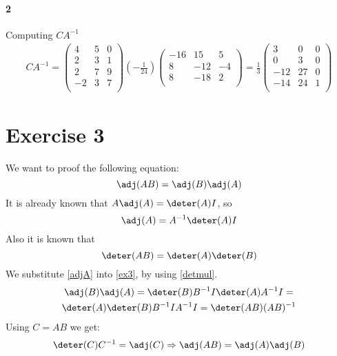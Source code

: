 \paragraph*{2}
Computing $CA^{-1}$
\begin{gather*}
CA^{-1} =
\left( \begin{array}{ccc}
4 & 5 & 0 \\
2 & 3 & 1\\
2 & 7 & 9\\
-2 & 3 & 7\\
\end{array} \right)
( -\frac{1}{24})
\left( \begin{array}{ccc}
-16 & 15 & 5 \\
8 & -12 & -4 \\
8 & -18 & 2 \\
\end{array} \right)
=
\frac{1}{3}
\left( \begin{array}{ccc}
3 & 0 & 0\\
0 & 3 & 0\\
-12 & 27 & 0\\
-14 & 24 & 1\\
\end{array} \right)
\end{gather*}

\section{Exercise 3}
We want to proof the following equation:
\begin{equation}
\label{ex3}
\adj (AB) = \adj (B) \adj (A)
\end{equation}
It is already known that $A \adj (A) = \deter (A) I$, so
\begin{equation}
\label{adjA}
\adj (A) = A^{-1} \deter (A) I
\end{equation} 
Also it is known that 
\begin{equation}
\label{detmul}
\deter (AB) = \deter(A) \deter(B)
\end{equation}
We substitute \ref{adjA} into \ref{ex3}, by using \ref{detmul}.
\begin{gather*}
\adj (B) \adj (A) = \deter (B) B^{-1} I \deter (A) A^{-1} I = \\
\deter (A) \deter (B) B^{-1} I A^{-1} I = \deter (AB) (AB)^{-1}
\end{gather*}
Using $C=AB$ we get:
\begin{gather*}
\deter(C) C^{-1} = \adj (C) \Rightarrow \adj (AB) = \adj (A) \adj (B)
\end{gather*}

